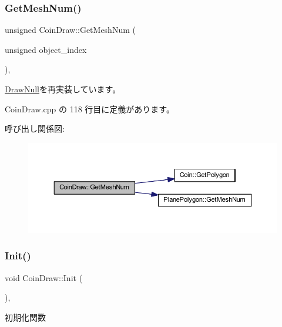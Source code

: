 \subsubsection{\texorpdfstring{Get\+Mesh\+Num()}{GetMeshNum()}}
{\footnotesize\ttfamily unsigned Coin\+Draw\+::\+Get\+Mesh\+Num (\begin{DoxyParamCaption}\item[{unsigned}]{object\+\_\+index }\end{DoxyParamCaption})\hspace{0.3cm}{\ttfamily [override]}, {\ttfamily [virtual]}}



\mbox{\hyperlink{class_draw_null_ad735978a85a5f3583eecd82d6bfe6413}{Draw\+Null}}を再実装しています。



 Coin\+Draw.\+cpp の 118 行目に定義があります。

呼び出し関係図\+:\nopagebreak
\begin{figure}[H]
\begin{center}
\leavevmode
\includegraphics[width=350pt]{class_coin_draw_a178c8d88effe55aaad7d0e45b02e0566_cgraph}
\end{center}
\end{figure}
\mbox{\label{class_coin_draw_ad0f5da5cfb896541fd59b1ab4a8593d1}} 
\subsubsection{\texorpdfstring{Init()}{Init()}}
{\footnotesize\ttfamily void Coin\+Draw\+::\+Init (\begin{DoxyParamCaption}{ }\end{DoxyParamCaption})\hspace{0.3cm}{\ttfamily [override]}, {\ttfamily [virtual]}}



初期化関数 



